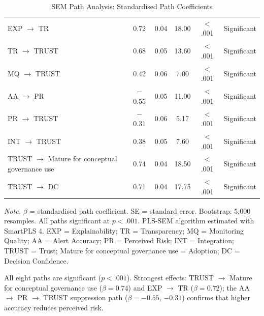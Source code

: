 \begin{table}[!htbp]
\tablestripes
\caption{SEM Path Analysis: Standardised Path Coefficients}
\tablefontsize
\begin{tabularx}{\textwidth}{@{} >{\raggedright\arraybackslash}p{3cm} C C C C L @{}}
\toprule
{} & \thead{$\beta$} &  &  &  &  \\
\midrule
EXP $\to$ TR & 0.72 & 0.04 & 18.00 & $<$.001 & Significant \\
TR $\to$ TRUST & 0.68 & 0.05 & 13.60 & $<$.001 & Significant \\
MQ $\to$ TRUST & 0.42 & 0.06 & 7.00 & $<$.001 & Significant \\
AA $\to$ PR & $-$0.55 & 0.05 & 11.00 & $<$.001 & Significant \\
PR $\to$ TRUST & $-$0.31 & 0.06 & 5.17 & $<$.001 & Significant \\
INT $\to$ TRUST & 0.38 & 0.05 & 7.60 & $<$.001 & Significant \\
TRUST $\to$ Mature for conceptual governance use & 0.74 & 0.04 & 18.50 & $<$.001 & Significant \\
TRUST $\to$ DC & 0.71 & 0.04 & 17.75 & $<$.001 & Significant \\
\bottomrule
\end{tabularx}
\vspace{0.5em}\noindent\textit{Note.} $\beta$ = standardised path coefficient. SE = standard error. Bootstrap: 5,000 resamples. All paths significant at $p < .001$. PLS-SEM algorithm estimated with SmartPLS 4. EXP = Explainability; TR = Transparency; MQ = Monitoring Quality; AA = Alert Accuracy; PR = Perceived Risk; INT = Integration; TRUST = Trust; Mature for conceptual governance use = Adoption; DC = Decision Confidence.
\end{table}

\vspace{1em}

All eight paths are significant ($p < .001$). Strongest effects: TRUST $\to$ Mature for conceptual governance use ($\beta = 0.74$) and EXP $\to$ TR ($\beta = 0.72$); the AA $\to$ PR $\to$ TRUST suppression path ($\beta = -0.55$, $-0.31$) confirms that higher accuracy reduces perceived risk.


